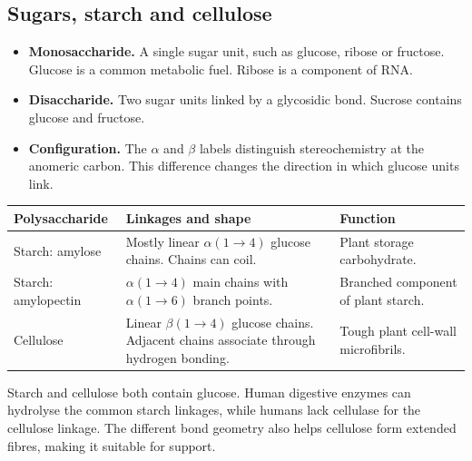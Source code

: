 \documentclass[12pt,a4paper]{article}
\begin{document}
\subsection{Sugars, starch and cellulose}
\begin{itemize}[leftmargin=*, itemsep=3pt, topsep=4pt]
  \item \textbf{Monosaccharide.} A single sugar unit, such as glucose, ribose or fructose. Glucose is a common metabolic fuel. Ribose is a component of RNA.
  \item \textbf{Disaccharide.} Two sugar units linked by a glycosidic bond. Sucrose contains glucose and fructose.
  \item \textbf{Configuration.} The $\alpha$ and $\beta$ labels distinguish stereochemistry at the anomeric carbon. This difference changes the direction in which glucose units link.
\end{itemize}
\par\vspace{5pt}
\begingroup
\setlength{\extrarowheight}{1pt}
\noindent\begin{tabularx}{\linewidth}{|B{3.1cm}|Y|Y|}
\hline
\textbf{Polysaccharide} & \textbf{Linkages and shape} & \textbf{Function} \\ \hline
Starch: amylose & Mostly linear $\alpha(1\to4)$ glucose chains. Chains can coil. & Plant storage carbohydrate. \\ \hline
Starch: amylopectin & $\alpha(1\to4)$ main chains with $\alpha(1\to6)$ branch points. & Branched component of plant starch. \\ \hline
Cellulose & Linear $\beta(1\to4)$ glucose chains. Adjacent chains associate through hydrogen bonding. & Tough plant cell-wall microfibrils. \\ \hline
\end{tabularx}\par
\endgroup
\begin{tcolorbox}[examplebox, title={Same monomer, different material}]
Starch and cellulose both contain glucose. Human digestive enzymes can hydrolyse the common starch linkages, while humans lack cellulase for the cellulose linkage. The different bond geometry also helps cellulose form extended fibres, making it suitable for support.
\end{tcolorbox}
\end{document}
